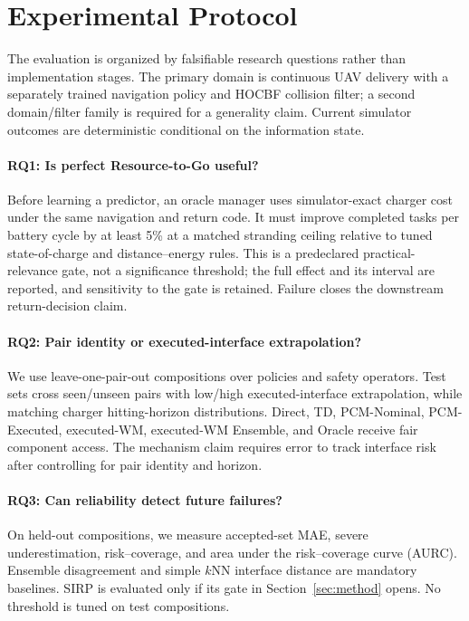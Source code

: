 \section{Experimental Protocol}
\label{sec:experiments}

The evaluation is organized by falsifiable research questions rather than implementation stages. The primary domain is continuous UAV delivery with a separately trained navigation policy and HOCBF collision filter; a second domain/filter family is required for a generality claim. Current simulator outcomes are deterministic conditional on the information state.

\paragraph{RQ1: Is perfect Resource-to-Go useful?}
Before learning a predictor, an oracle manager uses simulator-exact charger cost under the same navigation and return code. It must improve completed tasks per battery cycle by at least 5\% at a matched stranding ceiling relative to tuned state-of-charge and distance--energy rules. This is a predeclared practical-relevance gate, not a significance threshold; the full effect and its interval are reported, and sensitivity to the gate is retained. Failure closes the downstream return-decision claim.

\paragraph{RQ2: Pair identity or executed-interface extrapolation?}
We use leave-one-pair-out compositions over policies and safety operators. Test sets cross seen/unseen pairs with low/high executed-interface extrapolation, while matching charger hitting-horizon distributions. Direct, TD, PCM-Nominal, PCM-Executed, executed-WM, executed-WM Ensemble, and Oracle receive fair component access. The mechanism claim requires error to track interface risk after controlling for pair identity and horizon.

\paragraph{RQ3: Can reliability detect future failures?}
On held-out compositions, we measure accepted-set MAE, severe underestimation, risk--coverage, and area under the risk--coverage curve (AURC). Ensemble disagreement and simple $k$NN interface distance are mandatory baselines. SIRP is evaluated only if its gate in Section~\ref{sec:method} opens. No threshold is tuned on test compositions.

